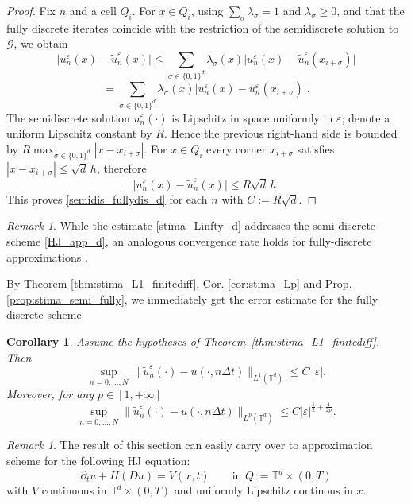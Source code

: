 \documentclass[11pt]{amsart}
\newtheorem{cor}[thm]{Corollary}
\theoremstyle{remark}
\newtheorem{rem}[thm]{Remark}
\theoremstyle{definition}
\theoremstyle{Claim}
\newcommand{\T}{{\mathbb{T}}}
\theoremstyle{plain}
\newcommand{\dt}{{\Delta t}}
\begin{document}
\begin{proof}
Fix $n$ and a cell $Q_{i}$. For $x\in Q_{ i}$, using $\sum_\sigma\lambda_\sigma=1$ and $\lambda_\sigma\ge0$, and that the fully discrete iterates coincide with the restriction of the semidiscrete solution to $\mathcal G$, we obtain
\[
\big|u_n^\varepsilon(x)-\tilde u_n^\varepsilon(x)\big|
\le \sum_{\sigma\in\{0,1\}^d}\lambda_\sigma(x)\big|u_n^\varepsilon(x)-\tilde u_n^\varepsilon(x_{i+\sigma})\big|
\]
\[
=\sum_{\sigma\in\{0,1\}^d}\lambda_\sigma(x)\big|u_n^\varepsilon(x)-u_n^\varepsilon(x_{i+\sigma})\big|.
\]
The semidiscrete solution $u_n^\varepsilon(\cdot)$ is Lipschitz in space uniformly in $\varepsilon$; denote a uniform Lipschitz constant by $R$. Hence the previous right-hand side is bounded by
\(
 R\max_{\sigma\in\{0,1\}^d}|x-x_{i+\sigma}|.
\)
For $x\in Q_{ i}$ every corner $x_{ i+\sigma}$ satisfies $|x-x_{ i+\sigma}|\le \sqrt{d}\,h$, therefore
\[
\big|u_n^\varepsilon(x)-\tilde u_n^\varepsilon(x)\big|\le R\sqrt{d}\,h.
\]
This proves \eqref{semidis_fullydis_d} for each $n$ with $C:=R\sqrt{d}$.
\end{proof}
\begin{rem}
While the estimate \eqref{stima_Linfty_d} addresses the semi-discrete scheme \eqref{HJ_app_d}, an analogous convergence rate holds for fully-discrete approximations \cite{cl}.
\end{rem}
By Theorem \ref{thm:stima_L1_finitediff}, Cor. \ref{cor:stima_Lp} and Prop. \ref{prop:stima_semi_fully}, we immediately get the error estimate for the fully discrete scheme
\begin{cor}
Assume the hypotheses of Theorem~\ref{thm:stima_L1_finitediff}. Then
	\begin{equation}\label{stima_ fully_L1}
		\sup_{n=0,\dots,N} \|\tilde u_n^\varepsilon(\cdot)-u(\cdot,n\dt)\|_{L^1(\T^d)} \le C\,|\varepsilon|.
	\end{equation}
Moreover, for any $p\in [1,+\infty]$
\[
\sup_{n=0,\dots,N}\|\tilde u_n^\varepsilon(\cdot)-u(\cdot,n\dt)\|_{L^p(\T^d)}\leq C|\varepsilon|^{\frac12+\frac{1}{2p}}.
\]
\end{cor}
\begin{rem}
The result of this section  can easily carry over to approximation scheme for the following
HJ equation:
\[
	\partial_t u + H(Du) = V(x,t) \qquad \text{in } Q := \mathbb{T}^d\times(0,T)
\]
with $V$ continuous in $\T^d\times (0,T)$ and uniformly Lipschitz continous in $x$.
\end{rem}

\end{document}
